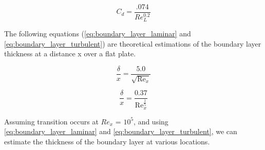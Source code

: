 \begin{equation} \label{eq:coeff_drag_estimation}
    C_d = \frac{.074}{Re_L^{0.2}}
\end{equation}

\noindent The following equations (\autoref{eq:boundary_layer_laminar} and \autoref{eq:boundary_layer_turbulent}) are theoretical estimations of the boundary layer thickness at a distance \gls{x} over a flat plate.

\begin{equation} \label{eq:boundary_layer_laminar}
    \frac{\delta}{x} = \frac{5.0}{\sqrt{\text{Re}_x}}
\end{equation}

\begin{equation} \label{eq:boundary_layer_turbulent}
    \frac{\delta}{x} = \frac{0.37}{\text{Re}_x^\frac{1}{5}}
\end{equation}

\noindent Assuming transition occurs at $Re_x$ = $10^5$, and using  \autoref{eq:boundary_layer_laminar} and \autoref{eq:boundary_layer_turbulent}, we can estimate the thickness of the boundary layer at various locations.
